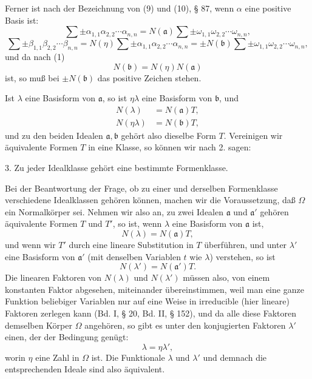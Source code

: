 \documentclass[11pt]{article}
\begin{document}
Ferner ist nach der Bezeichnung von (9) und (10), § 87, wenn $\alpha$ eine positive Basis ist:
\[
 \sum\pm \alpha_{1,1}\alpha_{2,2}\cdots\alpha_{n,n}=N(\mathfrak a)\sum\pm \omega_{1,1}\omega_{2,2}\cdots\omega_{n,n},
\]
\[
 \sum\pm \beta_{1,1}\beta_{2,2}\cdots\beta_{n,n}=N(\eta)
 \sum\pm \alpha_{1,1}\alpha_{2,2}\cdots\alpha_{n,n}
 =\pm N(\mathfrak b)\sum\pm \omega_{1,1}\omega_{2,2}\cdots\omega_{n,n},
\]
und da nach (1)
\begin{equation}
 N(\mathfrak b)=N(\eta)N(\mathfrak a)\tag{5}
\end{equation}
ist, so muß bei $\pm N(\mathfrak b)$ das positive Zeichen stehen.

Ist $\lambda$ eine Basisform von $\mathfrak a$, so ist $\eta\lambda$ eine Basisform von $\mathfrak b$, und
\begin{equation}
 \begin{aligned}
 N(\lambda)&=N(\mathfrak a)T,\\
 N(\eta\lambda)&=N(\mathfrak b)T,
 \end{aligned}\tag{6}
\end{equation}
und zu den beiden Idealen $\mathfrak a,\mathfrak b$ gehört also dieselbe Form $T$. Vereinigen wir äquivalente Formen $T$ in eine Klasse, so können wir nach 2. sagen:

3. Zu jeder Idealklasse gehört eine bestimmte Formenklasse.

Bei der Beantwortung der Frage, ob zu einer und derselben Formenklasse verschiedene Idealklassen gehören können, machen wir die Voraussetzung, daß $\Omega$ ein Normalkörper sei. Nehmen wir also an, zu zwei Idealen $\mathfrak a$ und $\mathfrak a'$ gehören äquivalente Formen $T$ und $T'$, so ist, wenn $\lambda$ eine Basisform von $\mathfrak a$ ist,
\begin{equation}
 N(\lambda)=N(\mathfrak a)T,\tag{7}
\end{equation}
und wenn wir $T'$ durch eine lineare Substitution in $T$ überführen, und unter $\lambda'$ eine Basisform von $\mathfrak a'$ (mit denselben Variablen $t$ wie $\lambda$) verstehen, so ist
\begin{equation}
 N(\lambda')=N(\mathfrak a')T.\tag{8}
\end{equation}
Die linearen Faktoren von $N(\lambda)$ und $N(\lambda')$ müssen also, von einem konstanten Faktor abgesehen, miteinander übereinstimmen, weil man eine ganze Funktion beliebiger Variablen nur auf eine Weise in irreducible (hier lineare) Faktoren zerlegen kann (Bd. I, § 20, Bd. II, § 152), und da alle diese Faktoren demselben Körper $\Omega$ angehören, so gibt es unter den konjugierten Faktoren $\lambda'$ einen, der der Bedingung genügt:
\[
 \lambda=\eta\lambda',
\]
worin $\eta$ eine Zahl in $\Omega$ ist. Die Funktionale $\lambda$ und $\lambda'$ und demnach die entsprechenden Ideale sind also äquivalent.
\end{document}
